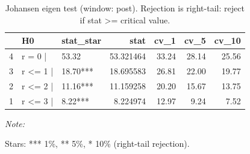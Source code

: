 \begin{table}[!h]
\centering
\caption{Johansen eigen test (window: post). Rejection is right-tail: reject if stat >= critical value.}
\centering
\begin{threeparttable}
\begin{tabular}[t]{lllrrrr}
\toprule
  & H0 & stat\_star & stat & cv\_1 & cv\_5 & cv\_10\\
\midrule
4 & r = 0  | & 53.32 & 53.321464 & 33.24 & 28.14 & 25.56\\
3 & r <= 1 | & 18.70*** & 18.695583 & 26.81 & 22.00 & 19.77\\
2 & r <= 2 | & 11.16*** & 11.159258 & 20.20 & 15.67 & 13.75\\
1 & r <= 3 | & 8.22*** & 8.224974 & 12.97 & 9.24 & 7.52\\
\bottomrule
\end{tabular}
\begin{tablenotes}
\item \textit{Note: } 
\item Stars: *** 1\%, ** 5\%, * 10\% (right-tail rejection).
\end{tablenotes}
\end{threeparttable}
\end{table}
